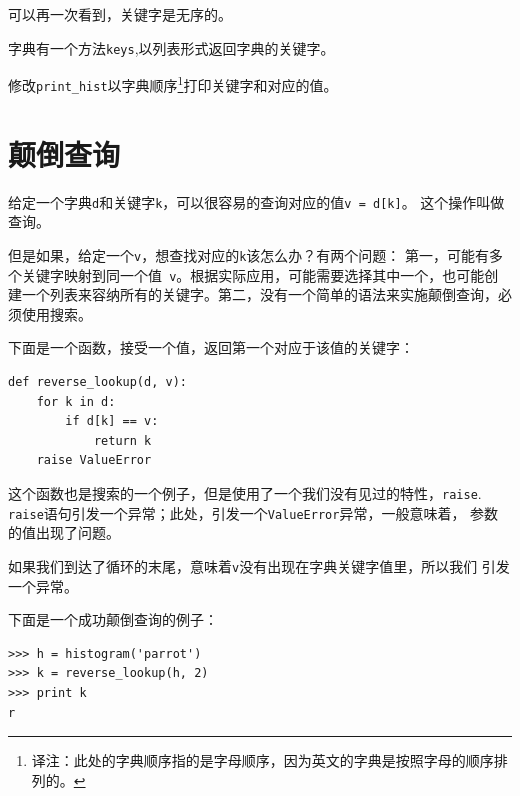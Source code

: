 可以再一次看到，关键字是无序的。


\begin{ex}


字典有一个方法{\tt keys},以列表形式返回字典的关键字。

修改\verb"print_hist"以字典顺序\footnote{译注：此处的字典顺序指的是字母顺序，因为英文的字典是按照字母的顺序排列的。}打印关键字和对应的值。

\end{ex}



\section{颠倒查询}


给定一个字典{\tt d}和关键字{\tt k}，可以很容易的查询对应的值{\tt v = d[k]}。
这个操作叫做查询。

但是如果，给定一个{\tt v}，想查找对应的{\tt k}该怎么办？有两个问题：
第一，可能有多个关键字映射到同一个值{\tt
	v}。根据实际应用，可能需要选择其中一个，也可能创建一个列表来容纳所有的关键字。第二，没有一个简单的语法来实施颠倒查询，必须使用搜索。


下面是一个函数，接受一个值，返回第一个对应于该值的关键字：

\beforeverb
\begin{verbatim}
def reverse_lookup(d, v):
    for k in d:
        if d[k] == v:
            return k
    raise ValueError
\end{verbatim}
\afterverb
%

这个函数也是搜索的一个例子，但是使用了一个我们没有见过的特性，{\tt raise}.
{\tt raise}语句引发一个异常；此处，引发一个{\tt ValueError}异常，一般意味着，
参数的值出现了问题。



如果我们到达了循环的末尾，意味着{\tt v}没有出现在字典关键字值里，所以我们
引发一个异常。

下面是一个成功颠倒查询的例子：

\beforeverb
\begin{verbatim}
>>> h = histogram('parrot')
>>> k = reverse_lookup(h, 2)
>>> print k
r
\end{verbatim}
\afterverb


